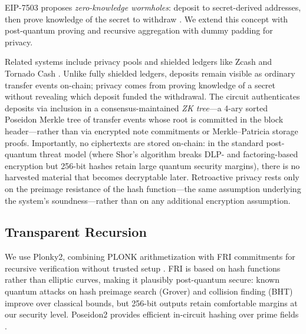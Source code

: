 \documentclass{iacrcc}
\begin{document}
EIP-7503 proposes \emph{zero-knowledge wormholes}: deposit to secret-derived addresses, then prove knowledge of the secret to withdraw \cite{eip7503}. We extend this concept with post-quantum proving and recursive aggregation with dummy padding for privacy.

Related systems include privacy pools and shielded ledgers like Zcash and Tornado Cash \cite{eip7503,privacypools,zcash,tornadocash}. Unlike fully shielded ledgers, deposits remain visible as ordinary transfer events on-chain; privacy comes from proving knowledge of a secret without revealing which deposit funded the withdrawal. The circuit authenticates deposits via inclusion in a consensus-maintained \emph{ZK tree}---a 4-ary sorted Poseidon Merkle tree of transfer events whose root is committed in the block header---rather than via encrypted note commitments or Merkle--Patricia storage proofs. Importantly, no ciphertexts are stored on-chain: in the standard post-quantum threat model (where Shor's algorithm breaks DLP- and factoring-based encryption but 256-bit hashes retain large quantum security margins), there is no harvested material that becomes decryptable later. Retroactive privacy rests only on the preimage resistance of the hash function---the same assumption underlying the system's soundness---rather than on any additional encryption assumption.

\subsection{Transparent Recursion}

We use Plonky2, combining PLONK arithmetization with FRI commitments for recursive verification without trusted setup \cite{plonky2,fri}. FRI is based on hash functions rather than elliptic curves, making it plausibly post-quantum secure: known quantum attacks on hash preimage search (Grover) and collision finding (BHT) improve over classical bounds, but 256-bit outputs retain comfortable margins at our security level. Poseidon2 provides efficient in-circuit hashing over prime fields \cite{poseidon2}.
\end{document}

